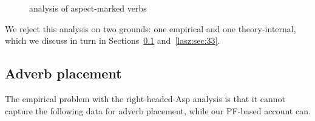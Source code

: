 \documentclass[output=paper]{langscibook}
\begin{document}
\begin{figure}
    \caption{ analysis of aspect-marked verbs}
    \label{lasz:fig:2}
\end{figure}

We reject this analysis on two grounds: one empirical and one
theory-internal, which we discuss in turn in Sections~\ref{lasz:sec:32} and~\ref{lasz:sec:33}.


\subsection{Adverb placement}
\label{lasz:sec:32}

The empirical problem with the right-headed-Asp analysis is that it
cannot capture the following data for adverb placement, while our PF-based account can.
\end{document}
